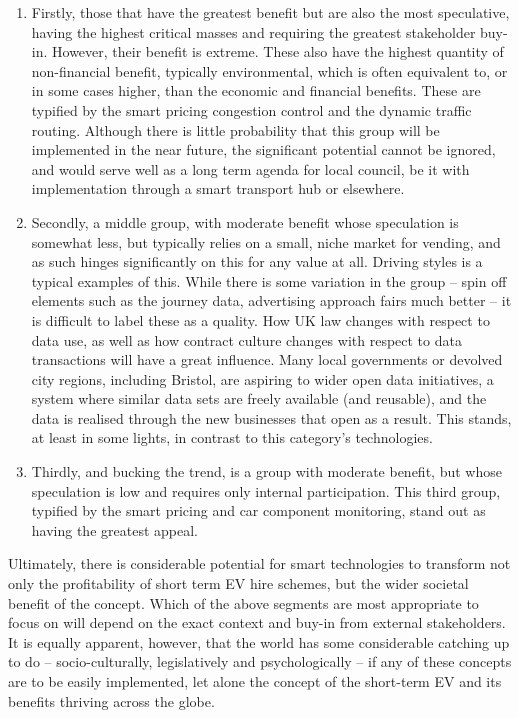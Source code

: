 \documentclass[journal]{IEEEtran}
\begin{document}
\begin{enumerate}
\item Firstly, those that have the greatest benefit but are also the
  most speculative, having the highest critical masses and requiring
  the greatest stakeholder buy-in. However, their benefit is
  extreme. These also have the highest quantity of non-financial
  benefit, typically environmental, which is often equivalent to, or
  in some cases higher, than the economic and financial benefits. These
  are typified by the smart pricing congestion control and the dynamic
  traffic routing. Although there is little probability that this
  group will be implemented in the near future, the significant potential
  cannot be ignored, and would serve well as a long term agenda for
  local council, be it with implementation through a smart transport hub or
  elsewhere.
\item Secondly, a middle group, with moderate benefit whose
  speculation is somewhat less, but typically relies on a small, niche
  market for vending, and as such hinges significantly on this for any
  value at all. Driving styles is a typical examples of this. While
  there is some variation in the group -- spin off elements such as the
  journey data, advertising approach fairs much better -- it is
  difficult to label these as a quality. How UK law changes with respect
  to data use, as well as how contract culture changes with respect to
  data transactions will have a great influence. Many local
  governments or devolved city regions, including Bristol, are
  aspiring to wider open data initiatives, a
  system where similar data sets are freely available (and reusable),
  and the data is realised through the new businesses that open as a result. This
  stands, at least in some lights, in contrast to this category's
  technologies. 
\item Thirdly, and bucking the trend, is a group with moderate
  benefit, but whose speculation is low and requires only internal
  participation. This third group, typified by the smart pricing and
  car component monitoring, stand out as having the greatest
  appeal. 
\end{enumerate}

Ultimately, there is considerable potential for smart technologies to
transform not only the profitability of short term EV hire schemes,
but the wider societal benefit of the concept. Which of the above
segments are most appropriate to focus on will depend on the exact
context and buy-in from external stakeholders. It is equally apparent,
however, that the world has some considerable catching up to do --
socio-culturally, legislatively and psychologically -- if any of these
concepts are to be easily implemented, let alone the concept of the
short-term EV and its benefits thriving across the globe.
\end{document}
